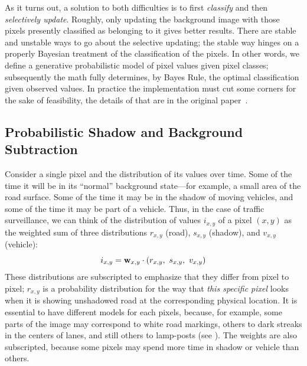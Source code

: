 As it turns out, a solution to both difficulties is to first
\emph{classify} and then \emph{selectively update}.  Roughly, only
updating the background image with those pixels presently classified as
belonging to it gives better results.  There are stable and
unstable ways to go about the selective updating; the stable way
hinges on a properly Bayesian treatment of the classification of the
pixels.  In other words, we define a generative
probabilistic model of pixel values given pixel classes; subsequently
the math fully determines, by Bayes Rule, the optimal classification
given observed values.  In practice the implementation must
cut some corners for the sake of feasibility, the details of that are
in the original paper~\cite{friedman1997image}. 




\subsection{Probabilistic Shadow and Background Subtraction}
\label{shadow-and-background-subtraction-section}
\label{pixel-model-section}


Consider a single pixel and the distribution of its values over time.
Some of the time it will be in its ``normal'' background state---for
example, a small area of the road surface. Some of the time it may be
in the shadow of moving vehicles, and some of the time it may be part
of a vehicle. Thus, in the case of traffic surveillance, we can think
of the distribution of values $i_{x,y}$ of a pixel $(x,y)$ as the
weighted sum of three distributions $r_{x,y}$ (road), $s_{x,y}$
(shadow), and $v_{x,y}$ (vehicle):
\[ i_{x,y} = \mbox{{\bf w}}_{x,y} \cdot (r_{x,y},\ s_{x,y},\ v_{x,y}) \]
These distributions are subscripted
to emphasize that they differ from pixel to pixel; $r_{x,y}$ is a
probability distribution for the way that {\em this specific pixel}
looks when it is showing unshadowed road at the corresponding physical
location. It is essential to have different models for each pixels,
because, for example, some parts of the image may correspond to white road
markings, others to dark streaks in the centers of lanes, and still
others to lamp-posts (see ).
The weights are also subscripted, because some pixels
may spend more time in shadow or vehicle than others.

